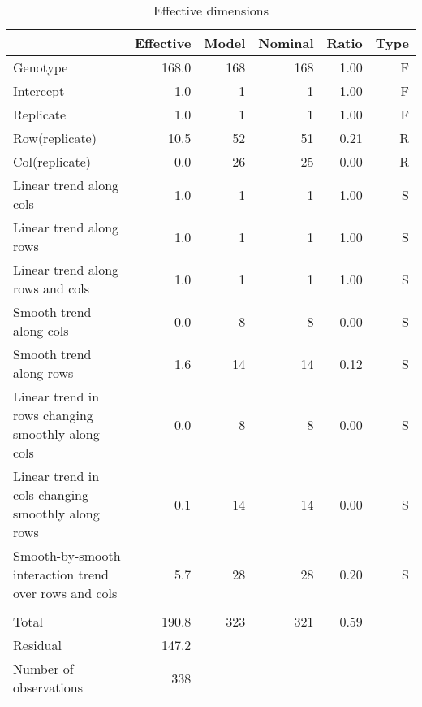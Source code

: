 \documentclass[a4paper,11pt]{article}\usepackage[]{graphicx}\usepackage[]{color}
\begin{document}
\newpage
\begin{table}[ht]
\begin{flushleft}
\caption{Effective dimensions} 
\label{effDims}
\begin{tabular}{lrrrrr}
  \hline
 & Effective & Model & Nominal & Ratio & Type \\ 
  \hline
Genotype & 168.0 & 168 & 168 & 1.00 & F \\ 
  Intercept & 1.0 & 1 & 1 & 1.00 & F \\ 
  Replicate & 1.0 & 1 & 1 & 1.00 & F \\ 
  Row(replicate) & 10.5 & 52 & 51 & 0.21 & R \\ 
  Col(replicate) & 0.0 & 26 & 25 & 0.00 & R \\ 
  Linear trend along cols & 1.0 & 1 & 1 & 1.00 & S \\ 
  Linear trend along rows & 1.0 & 1 & 1 & 1.00 & S \\ 
  Linear trend along rows and cols & 1.0 & 1 & 1 & 1.00 & S \\ 
  Smooth trend along cols & 0.0 & 8 & 8 & 0.00 & S \\ 
  Smooth trend along rows & 1.6 & 14 & 14 & 0.12 & S \\ 
  Linear trend in rows changing smoothly along cols & 0.0 & 8 & 8 & 0.00 & S \\ 
  Linear trend in cols changing smoothly along rows & 0.1 & 14 & 14 & 0.00 & S \\ 
  Smooth-by-smooth interaction trend over rows and cols & 5.7 & 28 & 28 & 0.20 & S \\ 
   &  &  &  &  &  \\ 
  Total & 190.8 & 323 & 321 & 0.59 &  \\ 
  Residual & 147.2 &  &  &  &  \\ 
  Number of observations & 338 &  &  &  &  \\ 
   \hline
\end{tabular}
\end{flushleft}
\end{table}
\end{document}

